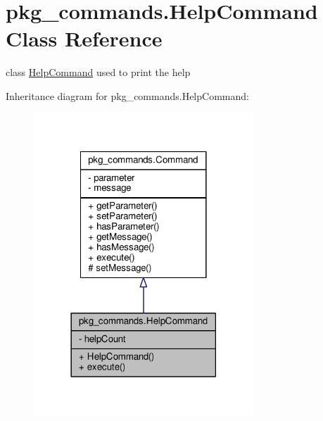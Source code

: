 \hypertarget{classpkg__commands_1_1HelpCommand}{\section{pkg\-\_\-commands.\-Help\-Command Class Reference}
\label{classpkg__commands_1_1HelpCommand}
}


class \hyperlink{classpkg__commands_1_1HelpCommand}{Help\-Command} used to print the help  




Inheritance diagram for pkg\-\_\-commands.\-Help\-Command\-:\nopagebreak
\begin{figure}[H]
\begin{center}
\leavevmode
\includegraphics[width=234pt]{classpkg__commands_1_1HelpCommand__inherit__graph}
\end{center}
\end{figure}


